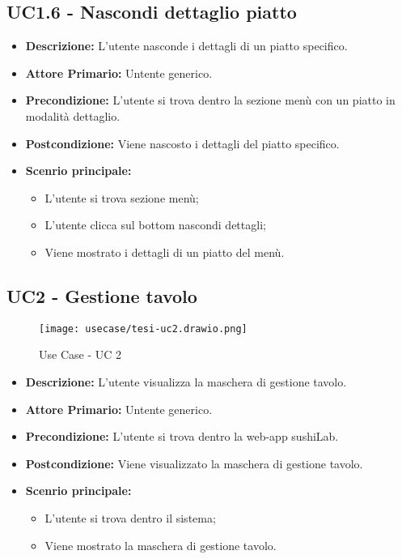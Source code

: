 \subsection{UC1.6 - Nascondi dettaglio piatto}
\begin{itemize}
    \item \textbf{Descrizione:} L'utente nasconde i dettagli di un piatto specifico.
    \item \textbf{Attore Primario:} Untente generico.
    \item \textbf{Precondizione:} L'utente si trova dentro la sezione menù con un piatto in modalità dettaglio.
    \item \textbf{Postcondizione:} Viene nascosto i dettagli del piatto specifico.
    \item \textbf{Scenrio principale:}  
    \begin{itemize}
        \item L'utente si trova sezione menù;
        \item L'utente clicca sul bottom nascondi dettagli;
        \item Viene mostrato i dettagli di un piatto del menù.
    \end{itemize}
\end{itemize}
\subsection{UC2 - Gestione tavolo}
\begin{figure}[H]
    \centering
    \texttt{[image: usecase/tesi-uc2.drawio.png]}
    \caption{Use Case - UC 2}
\end{figure}
\begin{itemize}
    \item \textbf{Descrizione:} L'utente visualizza la maschera di gestione tavolo.
    \item \textbf{Attore Primario:} Untente generico.
    \item \textbf{Precondizione:} L'utente si trova dentro la web-app sushiLab.
    \item \textbf{Postcondizione:} Viene visualizzato la maschera di gestione tavolo.
    \item \textbf{Scenrio principale:}
    \begin{itemize}
        \item L'utente si trova dentro il sistema;
        \item Viene mostrato la maschera di gestione tavolo.
    \end{itemize}
\end{itemize}
